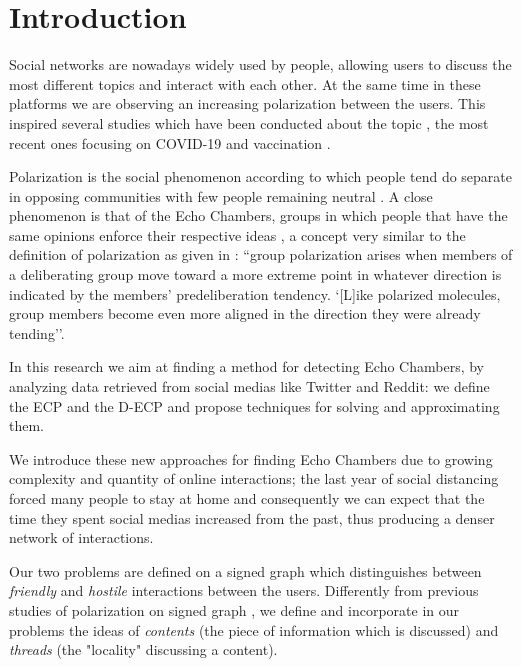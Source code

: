 \chapter{Introduction}
\label{ch:introduction}

Social networks are nowadays widely used by people, allowing users to
discuss the most different topics and interact with each other. At the same time in these
platforms we are observing an increasing polarization between the users.
This inspired several studies which have been conducted about the topic
\cite{Garimella2018,Guerra2013,conover2011political,gruzd2014investigating},
the most recent ones focusing on COVID-19
\cite{Jiang2021,green2020elusive,jiang2020political,lang2021maskon}
and vaccination \cite{Cossard2020}.

Polarization is the social phenomenon according to which people tend do
separate in opposing communities with few people remaining neutral
\cite{Guerra2013}. A close phenomenon is that of the Echo Chambers, groups in
which people that have the same opinions enforce their respective ideas
\cite{Garimella2018}, a concept very similar to the definition of polarization
as given in \cite{sunstein1999law}: ``group polarization arises when members of
a deliberating group move toward a more extreme point in whatever direction is
indicated by the members' predeliberation  tendency. `[L]ike polarized
molecules, group members become even more aligned in the direction they were
already tending''\cite{turner1987rediscovering}.

In this research we aim at finding a method for detecting Echo Chambers, by
analyzing data retrieved from social medias like Twitter and Reddit: we define
the \acrfull{ECP} and the \acrfull{D-ECP} and propose techniques for solving
and approximating them.

We introduce these new approaches for finding Echo Chambers due to growing complexity and quantity of
online interactions; the last year of social distancing forced
many people to stay at home and consequently we can expect that the time
they spent social medias increased from the past, thus producing a denser
network of interactions.

Our two problems are defined on a signed graph which distinguishes
between \emph{friendly} and \emph{hostile} interactions between the users.
Differently from previous studies of polarization on signed graph
\cite{xiao2020searching}, we define
and incorporate in our problems the ideas of \emph{contents} (the piece of
information which is discussed) and \emph{threads} (the "locality"
discussing a content).


